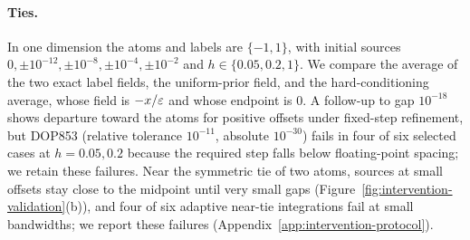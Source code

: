 \documentclass{article} %
\theoremstyle{plain}
\theoremstyle{definition}
\theoremstyle{remark}
\begin{document}
\paragraph{Ties.} In one dimension the atoms and labels are $\{-1,1\}$, with initial sources
$0,\pm10^{-12},\pm10^{-8},\pm10^{-4},\pm10^{-2}$ and $h\in\{0.05,0.2,1\}$. We compare the average of
the two exact label fields, the uniform-prior field, and the hard-conditioning average, whose field is
$-x/\varepsilon$ and whose endpoint is $0$. A follow-up to gap $10^{-18}$ shows departure toward the
atoms for positive offsets under fixed-step refinement, but DOP853 (relative tolerance $10^{-11}$,
absolute $10^{-30}$) fails in four of six selected cases at $h=0.05,0.2$ because the required
step falls below floating-point spacing; we retain these failures.
Near the symmetric tie of two atoms,
sources at small offsets stay close to the midpoint until very small gaps
(Figure~\ref{fig:intervention-validation}(b)), and four of six
adaptive near-tie integrations fail at small bandwidths; we report these failures
(Appendix~\ref{app:intervention-protocol}).
\end{document}
